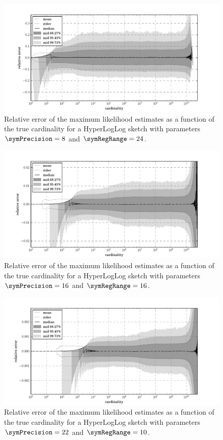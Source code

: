 \documentclass[a4paper]{scrartcl}
\begin{document}
\begin{figure}
\centering
\includegraphics[width=1\textwidth]{max_likelihood_estimate_8_24}
\caption{Relative error of the maximum likelihood estimates as a function of the true cardinality for a HyperLogLog sketch with parameters $\symPrecision = 8$ and $\symRegRange=24$.}
\label{fig:max_likelihood_estimation_error_8_24}
\end{figure}

\begin{figure}
\centering
\includegraphics[width=1\textwidth]{max_likelihood_estimate_16_16}
\caption{Relative error of the maximum likelihood estimates as a function of the true cardinality for a HyperLogLog sketch with parameters $\symPrecision = 16$ and $\symRegRange=16$.}
\label{fig:max_likelihood_estimation_error_16_16}
\end{figure}

\begin{figure}
\centering
\includegraphics[width=1\textwidth]{max_likelihood_estimate_22_10}
\caption{Relative error of the maximum likelihood estimates as a function of the true cardinality for a HyperLogLog sketch with parameters $\symPrecision = 22$ and $\symRegRange=10$.}
\label{fig:max_likelihood_estimation_error_22_10}
\end{figure}
\end{document}
